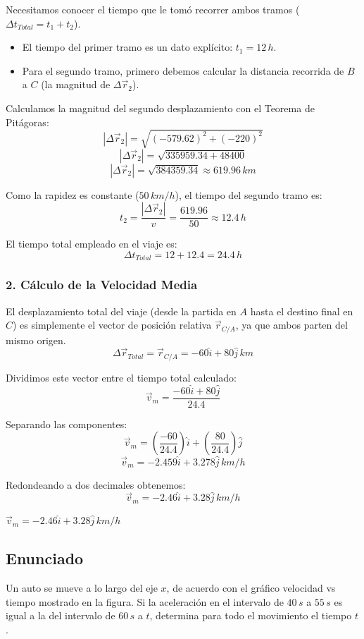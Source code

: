 \documentclass[12pt, a4paper]{article}
\begin{document}
Necesitamos conocer el tiempo que le tomó recorrer ambos tramos ($\Delta t_{Total} = t_1 + t_2$).
\begin{itemize}
    \item El tiempo del primer tramo es un dato explícito: $t_1 = 12 \, \si{h}$.
    \item Para el segundo tramo, primero debemos calcular la distancia recorrida de $B$ a $C$ (la magnitud de $\Delta\vec{r}_2$).
\end{itemize}

Calculamos la magnitud del segundo desplazamiento con el Teorema de Pitágoras:
$$ |\Delta\vec{r}_2| = \sqrt{(-579.62)^2 + (-220)^2} $$
$$ |\Delta\vec{r}_2| = \sqrt{335959.34 + 48400} $$
$$ |\Delta\vec{r}_2| = \sqrt{384359.34} \approx 619.96 \, \si{km} $$

Como la rapidez es constante ($50 \, \si{km/h}$), el tiempo del segundo tramo es:
$$ t_2 = \frac{|\Delta\vec{r}_2|}{v} = \frac{619.96}{50} \approx 12.4 \, \si{h} $$

El tiempo total empleado en el viaje es:
$$ \Delta t_{Total} = 12 + 12.4 = 24.4 \, \si{h} $$

\subsubsection*{2. Cálculo de la Velocidad Media}
El desplazamiento total del viaje (desde la partida en $A$ hasta el destino final en $C$) es simplemente el vector de posición relativa $\vec{r}_{C/A}$, ya que ambos parten del mismo origen.
$$ \Delta\vec{r}_{Total} = \vec{r}_{C/A} = -60\hat{i} + 80\hat{j} \, \si{km} $$

Dividimos este vector entre el tiempo total calculado:
$$ \vec{v}_m = \frac{-60\hat{i} + 80\hat{j}}{24.4} $$

Separando las componentes:
$$ \vec{v}_m = \left(\frac{-60}{24.4}\right)\hat{i} + \left(\frac{80}{24.4}\right)\hat{j} $$
$$ \vec{v}_m = -2.459\hat{i} + 3.278\hat{j} \, \si{km/h} $$

Redondeando a dos decimales obtenemos:
$$ \vec{v}_m = -2.46\hat{i} + 3.28\hat{j} \, \si{km/h} $$

\begin{tcolorbox}[colback=green!5!white, colframe=green!50!black, title=Respuesta Final]
\centering \Large $\vec{v}_m = -2.46\hat{i} + 3.28\hat{j} \, \si{km/h}$
\end{tcolorbox}

\newpage

\subsection*{Enunciado}
Un auto se mueve a lo largo del eje $x$, de acuerdo con el gráfico velocidad vs tiempo mostrado en la figura. Si la aceleración en el intervalo de $40 \, \si{s}$ a $55 \, \si{s}$ es igual a la del intervalo de $60 \, \si{s}$ a $t$, determina para todo el movimiento el tiempo $t$.
\end{document}
